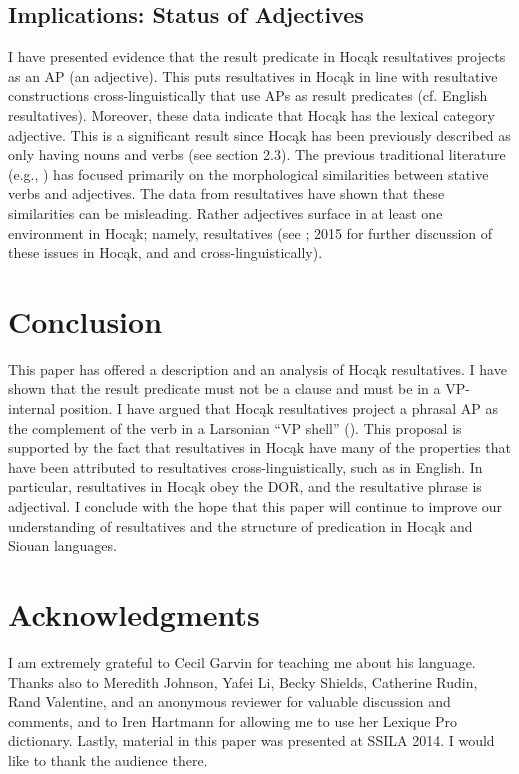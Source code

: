 \documentclass[output=paper]{LSP/langsci}
\begin{document}
\subsection{Implications: Status of Adjectives}

I have presented evidence that the result predicate in Hocąk resultatives projects as an AP (an adjective). This puts resultatives in Hocąk in line with resultative constructions cross-linguistically that use APs as result predicates (cf. English resultatives). Moreover, these data indicate that Hocąk has the lexical category adjective. This is a significant result since Hocąk has been previously described as only having nouns and verbs (see section 2.3). The previous traditional literature (e.g., \citealt{Helmbrecht2006}) has focused primarily on the morphological similarities between stative verbs and adjectives. The data from resultatives have shown that these similarities can be misleading. Rather adjectives surface in at least one environment in Hocąk; namely, resultatives (see \citealt{Rosen2014}; 2015 for further discussion of these issues in Hocąk, and \citealt{Baker2003} and \citealt{Dixon2004} cross-linguistically).

\section{Conclusion}\label{sec:rosen:6}
This paper has offered a description and an analysis of Hocąk resultatives. I have shown that the result predicate must not be a clause and must be in a VP-internal position. I have argued that Hocąk resultatives project a phrasal AP as the complement of the verb in a Larsonian ``VP shell'' (\citealt{Larson1988}). This proposal is supported by the fact that resultatives in Hocąk have many of the properties that have been attributed to resultatives cross-linguistically, such as in English. In particular, resultatives in Hocąk obey the DOR, and the resultative phrase is adjectival. I conclude with the hope that this paper will continue to improve our understanding of resultatives and the structure of predication in Hocąk and Siouan languages.

\section* {Acknowledgments}
I am extremely grateful to Cecil Garvin for teaching me about his language. Thanks also to Meredith Johnson, Yafei Li, Becky Shields, Catherine Rudin, Rand Valentine, and an anonymous reviewer for valuable discussion and comments, and to Iren Hartmann for allowing me to use her Lexique Pro dictionary. Lastly, material in this paper was presented at SSILA 2014. I would like to thank the audience there.
\end{document}
